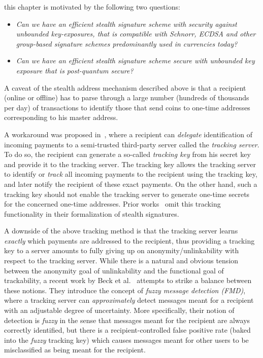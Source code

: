 this chapter is motivated by the following two questions:
\begin{itemize}[leftmargin=*]
    \item \emph{Can we have an efficient stealth signature scheme with security against unbounded key-exposures, that is compatible with Schnorr, ECDSA and other group-based signature schemes predominantly used in currencies today?}
    \item \emph{Can we have an efficient stealth signature scheme secure with unbounded key exposure that is post-quantum secure?}
\end{itemize}

A caveat of the stealth address mechanism described above is that a recipient (online or offline) has to parse through a large number (hundreds of thousands per day) of transactions to identify those that send coins to one-time addresses corresponding to his master address.

A workaround was proposed in~\cite{stealth2}, where a recipient can \emph{delegate} identification of incoming payments to a semi-trusted third-party server called the \emph{tracking server}. To do so, the recipient can generate a so-called \emph{tracking key} from his secret key and provide it to the tracking server. The tracking key allows the tracking server to identify or \emph{track} all incoming payments to the recipient using the tracking key, and later notify the recipient of these exact payments. On the other hand, such a tracking key should not enable the tracking server to generate one-time secrets for the concerned one-time addresses. Prior works~\cite{EUROSP:LYWNW19,ESORICS:LLNYY20} omit this tracking functionality in their formalization of stealth signatures.

A downside of the above tracking method is that the tracking server learns \emph{exactly} which payments are addressed to the recipient, thus providing a tracking key to a server amounts to fully giving up on anonymity/unlinkability with respect to the tracking server. While there is a natural and obvious tension between the anonymity goal of unlinkability and the functional goal of trackability, a recent work by Beck et al.~\cite{CCS:BLMG21} attempts to strike a balance between these notions. They introduce the concept of \emph{fuzzy message detection (FMD)}, where a tracking server can \emph{approximately} detect messages meant for a recipient with an adjustable degree of uncertainty. More specifically, their notion of detection is \emph{fuzzy} in the sense that messages meant for the recipient are always correctly identified, but there is a recipient-controlled false positive rate (baked into the \emph{fuzzy} tracking key) which causes messages meant for other users to be misclassified as being meant for the recipient. 

